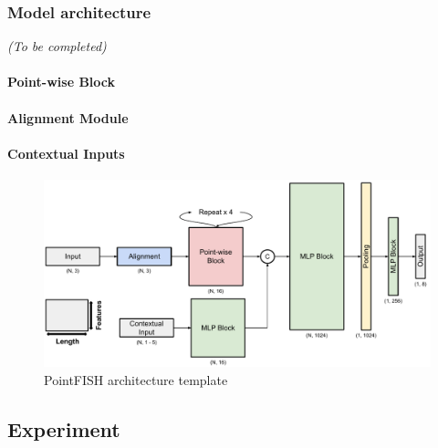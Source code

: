 \subsubsection{Model architecture}

\begin{center}
	\textit{(To be completed)}
\end{center}

\paragraph{Point-wise Block}

\paragraph{Alignment Module}

\paragraph{Contextual Inputs}






\begin{figure}[h]
    \centering
    \includegraphics[width=1\textwidth]{figures/chapter4/PointFISH_architecture}
    \caption{PointFISH architecture template}
    \label{fig:PointFISH_architecture}
\end{figure}

\subsection{Experiment} \label{subsec:experiment}


